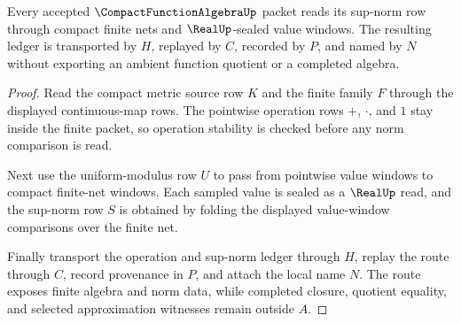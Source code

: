 \begin{theorem}
\label{thm:compact-function-algebra-uniform-norm-route}
Every accepted $\CompactFunctionAlgebraUp$ packet reads its sup-norm row through compact finite nets and $\RealUp$-sealed value windows. The resulting ledger is transported by $H$, replayed by $C$, recorded by $P$, and named by $N$ without exporting an ambient function quotient or a completed algebra.
\end{theorem}
\begin{proof}
Read the compact metric source row $K$ and the finite family $F$ through the displayed continuous-map rows. The pointwise operation rows $+$, $\cdot$, and $1$ stay inside the finite packet, so operation stability is checked before any norm comparison is read.

Next use the uniform-modulus row $U$ to pass from pointwise value windows to compact finite-net windows. Each sampled value is sealed as a $\RealUp$ read, and the sup-norm row $S$ is obtained by folding the displayed value-window comparisons over the finite net.

Finally transport the operation and sup-norm ledger through $H$, replay the route through $C$, record provenance in $P$, and attach the local name $N$. The route exposes finite algebra and norm data, while completed closure, quotient equality, and selected approximation witnesses remain outside $A$.
\end{proof}


\begin{closurestatus}{\CompactFunctionAlgebraUp}
  \theoryclosure{\seedClosure}
  \formalstatus{\unformalizedV}
\end{closurestatus}
